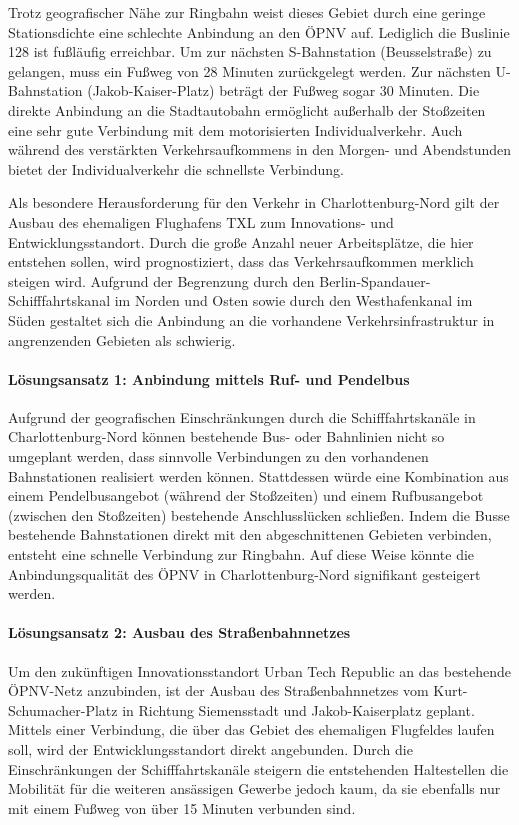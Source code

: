 Trotz geografischer Nähe zur Ringbahn weist dieses Gebiet durch eine geringe Stationsdichte eine schlechte Anbindung an den ÖPNV auf. Lediglich die Buslinie 128 ist fußläufig erreichbar. Um zur nächsten S-Bahnstation (Beusselstraße) zu gelangen, muss ein Fußweg von 28 Minuten zurückgelegt werden. Zur nächsten U-Bahnstation (Jakob-Kaiser-Platz) beträgt der Fußweg sogar 30 Minuten. Die direkte Anbindung an die Stadtautobahn ermöglicht außerhalb der Stoßzeiten eine sehr gute Verbindung mit dem motorisierten Individualverkehr. Auch während des verstärkten Verkehrsaufkommens in den Morgen- und Abendstunden bietet der Individualverkehr die schnellste Verbindung.


Als besondere Herausforderung für den Verkehr in Charlottenburg-Nord gilt der Ausbau des ehemaligen Flughafens TXL zum Innovations- und Entwicklungsstandort. Durch die große Anzahl neuer Arbeitsplätze, die hier entstehen sollen, wird prognostiziert, dass das Verkehrsaufkommen merklich steigen wird. Aufgrund der Begrenzung durch den Berlin-Spandauer-Schifffahrtskanal im Norden und Osten sowie durch den Westhafenkanal im Süden gestaltet sich die Anbindung an die vorhandene Verkehrsinfrastruktur in angrenzenden Gebieten als schwierig.

\paragraph{Lösungsansatz 1: Anbindung mittels Ruf- und Pendelbus}
Aufgrund der geografischen Einschränkungen durch die Schifffahrtskanäle in Charlottenburg-Nord können bestehende Bus- oder Bahnlinien nicht so umgeplant werden, dass sinnvolle Verbindungen zu den vorhandenen Bahnstationen realisiert werden können. Stattdessen würde eine Kombination aus einem Pendelbusangebot (während der Stoßzeiten) und einem Rufbusangebot (zwischen den Stoßzeiten) bestehende Anschlusslücken schließen. Indem die Busse bestehende Bahnstationen direkt mit den abgeschnittenen Gebieten verbinden, entsteht eine schnelle Verbindung zur Ringbahn. Auf diese Weise könnte die Anbindungsqualität des ÖPNV in Charlottenburg-Nord signifikant gesteigert werden.

\paragraph{Lösungsansatz 2: Ausbau des Straßenbahnnetzes}
Um den zukünftigen Innovationsstandort Urban Tech Republic an das bestehende ÖPNV-Netz anzubinden, ist der Ausbau des Straßenbahnnetzes vom Kurt-Schumacher-Platz in Richtung Siemensstadt und Jakob-Kaiserplatz geplant. Mittels einer Verbindung, die über das Gebiet des ehemaligen Flugfeldes laufen soll, wird der Entwicklungsstandort direkt angebunden. Durch die Einschränkungen der Schifffahrtskanäle steigern die entstehenden Haltestellen die Mobilität für die weiteren ansässigen Gewerbe jedoch kaum, da sie ebenfalls nur mit einem Fußweg von über 15 Minuten verbunden sind.

